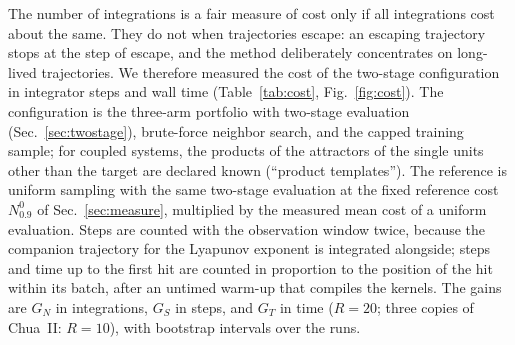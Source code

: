 The number of integrations is a fair measure of cost only if all integrations cost about the same. They do not when trajectories escape: an escaping trajectory stops at the step of escape, and the method deliberately concentrates on long-lived trajectories. We therefore measured the cost of the two-stage configuration in integrator steps and wall time (Table~\ref{tab:cost}, Fig.~\ref{fig:cost}). The configuration is the three-arm portfolio with two-stage evaluation (Sec.~\ref{sec:twostage}), brute-force neighbor search, and the capped training sample; for coupled systems, the products of the attractors of the single units other than the target are declared known (``product templates''). The reference is uniform sampling with the same two-stage evaluation at the fixed reference cost $N^0_{0.9}$ of Sec.~\ref{sec:measure}, multiplied by the measured mean cost of a uniform evaluation. Steps are counted with the observation window twice, because the companion trajectory for the Lyapunov exponent is integrated alongside; steps and time up to the first hit are counted in proportion to the position of the hit within its batch, after an untimed warm-up that compiles the kernels. The gains are $G_N$ in integrations, $G_S$ in steps, and $G_T$ in time ($R=20$; three copies of Chua~II: $R=10$), with bootstrap intervals over the runs.


